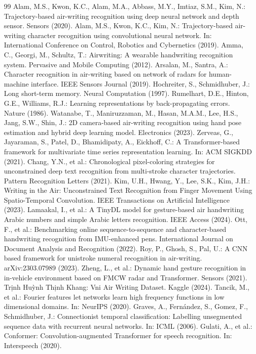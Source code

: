 \documentclass[runningheads]{llncs}
\begin{document}
\begin{thebibliography}{99}
 Alam, M.S., Kwon, K.C., Alam, M.A., Abbass, M.Y., Imtiaz, S.M., Kim, N.: Trajectory-based air-writing recognition using deep neural network and depth sensor. Sensors (2020).
 Alam, M.S., Kwon, K.C., Kim, N.: Trajectory-based air-writing character recognition using convolutional neural network. In: International Conference on Control, Robotics and Cybernetics (2019).
 Amma, C., Georgi, M., Schultz, T.: Airwriting: A wearable handwriting recognition system. Pervasive and Mobile Computing (2012).
 Arsalan, M., Santra, A.: Character recognition in air-writing based on network of radars for human-machine interface. IEEE Sensors Journal (2019).
 Hochreiter, S., Schmidhuber, J.: Long short-term memory. Neural Computation (1997).
 Rumelhart, D.E., Hinton, G.E., Williams, R.J.: Learning representations by back-propagating errors. Nature (1986).
 Watanabe, T., Maniruzzaman, M., Hasan, M.A.M., Lee, H.S., Jang, S.W., Shin, J.: 2D camera-based air-writing recognition using hand pose estimation and hybrid deep learning model. Electronics (2023).
 Zerveas, G., Jayaraman, S., Patel, D., Bhamidipaty, A., Eickhoff, C.: A Transformer-based framework for multivariate time series representation learning. In: ACM SIGKDD (2021).
 Chang, Y.N., et al.: Chronological pixel-coloring strategies for unconstrained deep text recognition from multi-stroke character trajectories. Pattern Recognition Letters (2021).
 Kim, U.H., Hwang, Y., Lee, S.K., Kim, J.H.: Writing in the Air: Unconstrained Text Recognition from Finger Movement Using Spatio-Temporal Convolution. IEEE Transactions on Artificial Intelligence (2023).
 Lamaakal, I., et al.: A TinyDL model for gesture-based air handwriting Arabic numbers and simple Arabic letters recognition. IEEE Access (2024).
 Ott, F., et al.: Benchmarking online sequence-to-sequence and character-based handwriting recognition from IMU-enhanced pens. International Journal on Document Analysis and Recognition (2022).
 Roy, P., Ghosh, S., Pal, U.: A CNN based framework for unistroke numeral recognition in air-writing. arXiv:2303.07989 (2023).
 Zheng, L., et al.: Dynamic hand gesture recognition in in-vehicle environment based on FMCW radar and Transformer. Sensors (2021).
 Trịnh Huỳnh Thịnh Khang: Vni Air Writing Dataset. Kaggle (2024).
 Tancik, M., et al.: Fourier features let networks learn high frequency functions in low dimensional domains. In: NeurIPS (2020).
 Graves, A., Fernández, S., Gomez, F., Schmidhuber, J.: Connectionist temporal classification: Labelling unsegmented sequence data with recurrent neural networks. In: ICML (2006).
 Gulati, A., et al.: Conformer: Convolution-augmented Transformer for speech recognition. In: Interspeech (2020).
\end{thebibliography}
\end{document}
